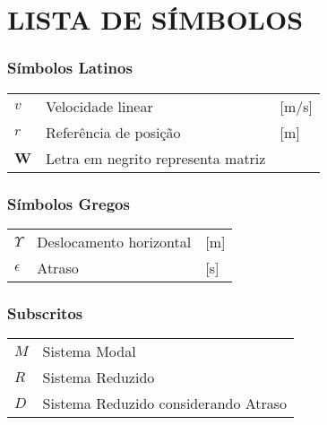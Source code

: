 




\chapter*{LISTA DE SÍMBOLOS}



\subsection*{Símbolos Latinos}

\begin{tabular}{p{}p{}>{\PreserveBacklash\raggedleft}p{}}
$v$  & Velocidade linear  & {[}m/s{]}\tabularnewline
$r$ & Referência de posição & {[}m{]}\tabularnewline
$\mathbf{W}$ & Letra em negrito representa matriz & \tabularnewline
\end{tabular}

\subsection*{Símbolos Gregos}

\begin{tabular}{p{}p{}>{\PreserveBacklash\raggedleft}p{}}
$\Upsilon$ & Deslocamento horizontal & {[}m{]}\tabularnewline
$\epsilon$ & Atraso & {[}s{]}\tabularnewline
\end{tabular}


\subsection*{Subscritos}

\begin{tabular}{p{}p{}}
$M$ & Sistema Modal\tabularnewline
$R$ & Sistema Reduzido\tabularnewline
$D$ & Sistema Reduzido considerando Atraso\tabularnewline
\end{tabular}


